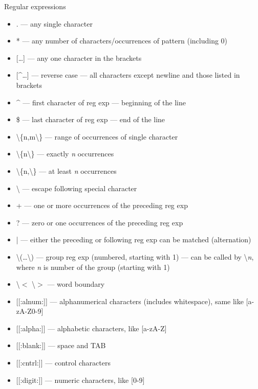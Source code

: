 \documentclass[hyperref={bookmarks=true, unicode=true, colorlinks=true, pdftitle={Linux, command line and MetaCentrum}, plainpages=false, pdfauthor={Vojtech Zeisek}, pdfsubject={Course about use of Linux command line, writing shell scripts and using MetaCentrum of CESNET}, pdfcreator={XeLaTeX, http://www.xelatex.org/}, pdfkeywords={Linux, GNU, BASH, shell, command line, MetaCentrum}, linkcolor=Sienna, anchorcolor=black, citecolor=green, filecolor=magenta, menucolor=Sienna, urlcolor=cyan, pdftex}, compress, ucs, xelatex, xcolor=svgnames, 11pt]{beamer}
\begin{document}
\begin{frame}[allowframebreaks]{Regular expressions}
\label{regexp}
\begin{itemize}
  \item \alert{.} --- any single character
  \item \alert{*} --- any number of characters/occurrences of pattern (including 0)
  \item \alert{[\ldots]} --- any one character in the brackets
  \item \alert{[\textasciicircum\ldots]} --- reverse case --- all characters except newline and those listed in brackets
  \item \alert{\textasciicircum} --- first character of reg exp --- beginning of the line
  \item \alert{\$} --- last character of reg exp --- end of the line
  \item \alert{\textbackslash\{n,m\textbackslash\}} --- range of occurrences of single character
  \item \alert{\textbackslash\{n\textbackslash\}} --- exactly \textit{n} occurrences
  \item \alert{\textbackslash\{n,\textbackslash\}} --- at least \textit{n} occurrences
  \item \alert{\textbackslash} --- escape following special character
  \item \alert{+} --- one or more occurrences of the preceding reg exp
  \item \alert{?} --- zero or one occurrences of the preceding reg exp
  \item \alert{|} --- either the preceding or following reg exp can be matched (alternation)
  \item \alert{\textbackslash(\ldots\textbackslash)} --- group reg exp (numbered, starting with 1) --- can be called by \alert{\textbackslash\textit{n}}, where \textit{n} is number of the group (starting with 1)
  \item \alert{\textbackslash$<$ \textbackslash$>$} --- word boundary
  \item \alert{[[:alnum:]]} --- alphanumerical characters (includes whitespace), same like \alert{[a-zA-Z0-9]}
  \item \alert{[[:alpha:]]} --- alphabetic characters, like \alert{[a-zA-Z]}
  \item \alert{[[:blank:]]} --- space and TAB
  \item \alert{[[:cntrl:]]} --- control characters
  \item \alert{[[:digit:]]} --- numeric characters, like \alert{[0-9]}

\end{itemize}
\end{frame}
\end{document}
